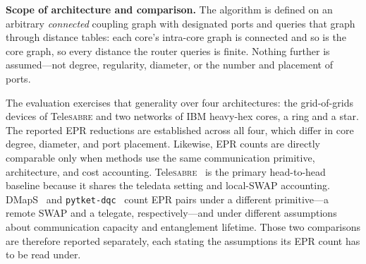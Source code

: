 \documentclass[journal]{IEEEtran}
\newcommand{\TeleSABRE}{Tele\textsc{sabre}}
\begin{document}
\textbf{Scope of architecture and comparison.}
The algorithm is defined on an arbitrary \emph{connected} coupling graph with
designated ports and queries that graph through distance tables: each core's
intra-core graph is connected and so is the core graph, so every distance the
router queries is finite. Nothing further is assumed---not degree, regularity,
diameter, or the number and placement of ports.

The evaluation exercises that generality over four architectures: the
grid-of-grids devices of \TeleSABRE{} and two networks of IBM heavy-hex cores,
a ring and a star. The reported EPR reductions are established across all
four, which differ in core degree, diameter, and port placement. Likewise, EPR counts are directly
comparable only when methods use
the same communication primitive, architecture, and cost accounting.
\TeleSABRE{}~\cite{russo2025telesabre} is the primary head-to-head baseline
because it shares the teledata setting and local-SWAP accounting.
DMapS~\cite{luo2025dmaps} and
\texttt{pytket-dqc}~\cite{andresmartinez2024heterogeneous,pytketdqc2024}
count EPR pairs under a different primitive---a remote SWAP and a telegate,
respectively---and under different assumptions about communication capacity
and entanglement lifetime. Those two comparisons are therefore reported
separately, each stating the assumptions its EPR count has to be read under.
\end{document}
